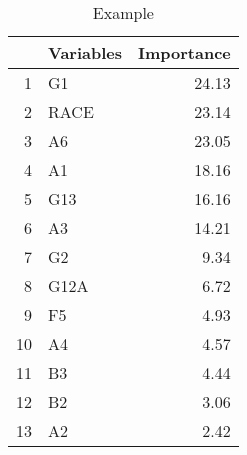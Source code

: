 \begin{table}[ht]
\centering
\begin{tabular}{rlr}
  \toprule
 & Variables & Importance \\ 
  \midrule
1 & G1 & 24.13 \\ 
  2 & RACE & 23.14 \\ 
  3 & A6 & 23.05 \\ 
  4 & A1 & 18.16 \\ 
  5 & G13 & 16.16 \\ 
  6 & A3 & 14.21 \\ 
  7 & G2 & 9.34 \\ 
  8 & G12A & 6.72 \\ 
  9 & F5 & 4.93 \\ 
  10 & A4 & 4.57 \\ 
  11 & B3 & 4.44 \\ 
  12 & B2 & 3.06 \\ 
  13 & A2 & 2.42 \\ 
   \bottomrule
\end{tabular}
\caption{Example} 
\end{table}
